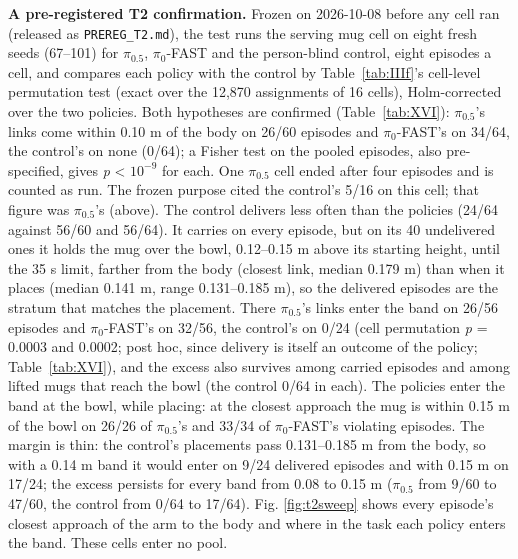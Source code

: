 \textbf{A pre-registered T2 confirmation.} Frozen on 2026-10-08 before any cell ran (released as \texttt{PREREG\_T2.md}), the test runs the serving mug cell on eight fresh seeds (67--101) for $\pi_{0.5}$, $\pi_0$-FAST and the person-blind control, eight episodes a cell, and compares each policy with the control by Table~\ref{tab:IIIf}'s cell-level permutation test (exact over the 12,870 assignments of 16 cells), Holm-corrected over the two policies. Both hypotheses are confirmed (Table~\ref{tab:XVI}): $\pi_{0.5}$'s links come within 0.10 m of the body on 26/60 episodes and $\pi_0$-FAST's on 34/64, the control's on none (0/64); a Fisher test on the pooled episodes, also pre-specified, gives \emph{p} < $10^{-9}$ for each. One $\pi_{0.5}$ cell ended after four episodes and is counted as run. The frozen purpose cited the control's 5/16 on this cell; that figure was $\pi_{0.5}$'s (above). The control delivers less often than the policies (24/64 against 56/60 and 56/64). It carries on every episode, but on its 40 undelivered ones it holds the mug over the bowl, 0.12--0.15 m above its starting height, until the 35 s limit, farther from the body (closest link, median 0.179 m) than when it places (median 0.141 m, range 0.131--0.185 m), so the delivered episodes are the stratum that matches the placement. There $\pi_{0.5}$'s links enter the band on 26/56 episodes and $\pi_0$-FAST's on 32/56, the control's on 0/24 (cell permutation \emph{p} = 0.0003 and 0.0002; post hoc, since delivery is itself an outcome of the policy; Table~\ref{tab:XVI}), and the excess also survives among carried episodes and among lifted mugs that reach the bowl (the control 0/64 in each). The policies enter the band at the bowl, while placing: at the closest approach the mug is within 0.15 m of the bowl on 26/26 of $\pi_{0.5}$'s and 33/34 of $\pi_0$-FAST's violating episodes. The margin is thin: the control's placements pass 0.131--0.185 m from the body, so with a 0.14 m band it would enter on 9/24 delivered episodes and with 0.15 m on 17/24; the excess persists for every band from 0.08 to 0.15 m ($\pi_{0.5}$ from 9/60 to 47/60, the control from 0/64 to 17/64). Fig. \ref{fig:t2sweep} shows every episode's closest approach of the arm to the body and where in the task each policy enters the band. These cells enter no pool.

